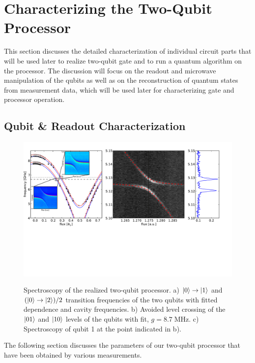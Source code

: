 \chapter{Characterizing the Two-Qubit Processor}

This section discusses the detailed characterization of individual circuit parts that will be used later to realize two-qubit gate and to run a quantum algorithm on the processor. The discussion will focus on the readout and microwave manipulation of the qubits as well as  on the reconstruction of quantum states from measurement data, which will be used later for characterizing gate and processor operation.

\section{Qubit \& Readout Characterization}

\begin{figure}[ht!]
	\centering
		\includegraphics[width=1.\textwidth]{"./data/ct5/2011_04_11 - anticrossing/processor_spectroscopy"}
	\label{fig:ProcessorSpectroscopy}
	\caption[Spectroscopy of the Two-Qubit Processor]{Spectroscopy of the realized two-qubit processor. a) $\left| 0 \right>\to\left| 1 \right>$ and $(\left| 0 \right>\to\left| 2 \right>)/2$ transition frequencies of the two qubits with fitted dependence and cavity frequencies. b) Avoided level crossing of the $\left| 01 \right>$ and $\left| 10 \right>$ levels of the qubits with fit, $g = 8.7 \; \mathrm{MHz}$. c) Spectroscopy of qubit 1 at the point indicated in b).}
\end{figure}

The following section discusses the parameters of our two-qubit processor that have been obtained by various measurements.

